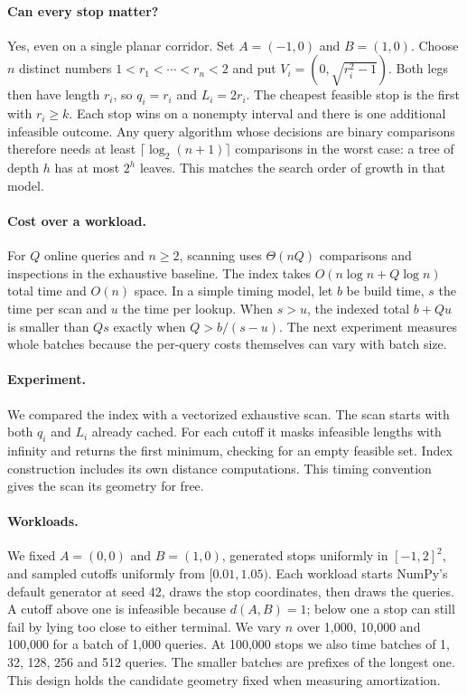 \documentclass[11pt]{article}
\begin{document}
\paragraph{Can every stop matter?}
Yes, even on a single planar corridor. Set $A=(-1,0)$ and $B=(1,0)$.
Choose $n$ distinct numbers $1<r_1<\cdots<r_n<2$ and put
$V_i=(0,\sqrt{r_i^2-1})$. Both legs then have length $r_i$,
so $q_i=r_i$ and $L_i=2r_i$. The cheapest feasible stop is the first
with $r_i\ge k$. Each stop wins on a nonempty interval and there is one
additional infeasible outcome. Any query algorithm whose decisions are
binary comparisons therefore needs at least $\lceil\log_2(n+1)\rceil$
comparisons in the worst case: a tree of depth $h$ has at most $2^h$
leaves. This matches the search order of growth in that model.

\paragraph{Cost over a workload.}
For $Q$ online queries and $n\ge2$, scanning uses $\Theta(nQ)$ comparisons
and inspections in the exhaustive baseline. The index takes
$O(n\log n+Q\log n)$ total time and $O(n)$ space. In a simple timing model,
let $b$ be build time, $s$ the time per scan and $u$ the time per lookup.
When $s>u$, the indexed total $b+Qu$ is smaller than $Qs$ exactly when
$Q>b/(s-u)$. The next experiment measures whole batches because the
per-query costs themselves can vary with batch size.

\newpage
\paragraph{Experiment.}
We compared the index with a vectorized exhaustive scan. The scan starts
with both $q_i$ and $L_i$ already cached. For each cutoff it masks infeasible
lengths with infinity and returns the first minimum, checking for an empty
feasible set. Index construction includes its own distance computations.
This timing convention gives the scan its geometry for free.


\paragraph{Workloads.}
We fixed $A=(0,0)$ and $B=(1,0)$, generated stops uniformly in
$[-1,2]^2$, and sampled cutoffs uniformly from $[0.01,1.05)$.
Each workload starts NumPy's default generator at seed 42, draws the
stop coordinates, then draws the queries. A cutoff above one is infeasible
because $d(A,B)=1$; below one a stop can still fail by lying too close to
either terminal. We vary $n$ over 1,000, 10,000 and 100,000 for a batch
of 1,000 queries. At 100,000 stops we also time batches of 1, 32, 128,
256 and 512 queries. The smaller batches are prefixes of the longest one.
This design holds the candidate geometry fixed when measuring amortization.
\end{document}

